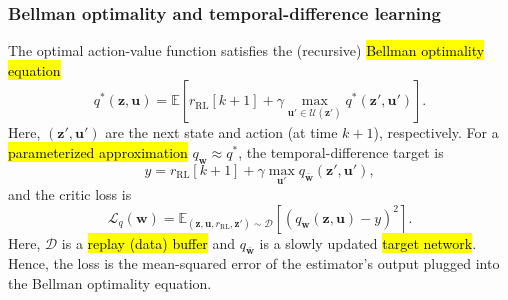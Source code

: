 \begin{frame}
	\frametitle{Bellman optimality and temporal-difference learning}
	The optimal action-value function satisfies the (recursive) \hl{Bellman optimality equation}
	\begin{equation}
		\boxed{
			q^{*}(\bm{z},\bm{u})
			=\mathbb{E}\left[
				r_{\mathrm{RL}}[k+1]
				+\gamma\max_{\bm{u}'\in\mathcal{U}(\bm{z}')}
				q^{*}(\bm{z}',\bm{u}')
				\right].}
	\end{equation}\pause%
	Here, $(\bm{z}',\bm{u}')$ are the next state and action (at time $k+1$), respectively. \pause For a \hl{parameterized approximation} $q_{\bm{w}}\approx q^{*}$, the temporal-difference target is
	\begin{equation}
		y=r_{\mathrm{RL}}[k+1]
		+\gamma\max_{\bm{u}'}
		q_{\bar{\bm{w}}}(\bm{z}',\bm{u}'),
	\end{equation}\pause%
	and the critic loss is
	\begin{equation}
		\mathcal{L}_{q}(\bm{w})
		=\mathbb{E}_{(\bm{z},\bm{u},r_{\mathrm{RL}},\bm{z}')\sim\mathcal{D}}
		\left[\left(q_{\bm{w}}(\bm{z},\bm{u})-y\right)^2\right].
	\end{equation}\pause%
	Here, $\mathcal{D}$ is a \hl{replay (data) buffer} and $q_{\bar{\bm{w}}}$ is a slowly updated \hl{target network}. \pause  Hence, the loss is the mean-squared error of the estimator's output plugged into the Bellman optimality equation.
\end{frame}

